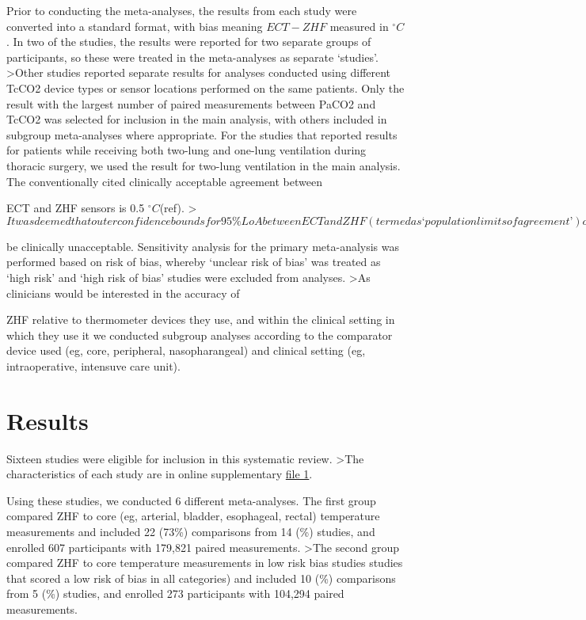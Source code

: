 \documentclass[smallextended]{svjour3}       %
\begin{document}
Prior to conducting the meta-analyses, the results from each study were
converted into a standard format, with bias meaning \(ECT - ZHF\)
measured in \(^\circ C\). In two of the studies, the results were
reported for two separate groups of participants, so these were treated
in the meta-analyses as separate `studies'. \textgreater{}Other studies
reported separate results for analyses conducted using different TcCO2
device types or sensor locations performed on the same patients. Only
the result with the largest number of paired measurements between PaCO2
and TcCO2 was selected for inclusion in the main analysis, with others
included in subgroup meta-analyses where appropriate. For the studies
that reported results for patients while receiving both two-lung and
one-lung ventilation during thoracic surgery, we used the result for
two-lung ventilation in the main analysis. The conventionally cited
clinically acceptable agreement between

ECT and ZHF sensors is 0.5 \(^\circ C\)(ref).
\textgreater{}\(It was deemed that outer confidence bounds for 95\% LoA between ECT and ZHF (termed as ‘population limits of agreement’) outside of these bounds would\)

be clinically unacceptable. Sensitivity analysis for the primary
meta-analysis was performed based on risk of bias, whereby `unclear risk
of bias' was treated as `high risk' and `high risk of bias' studies were
excluded from analyses. \textgreater{}As clinicians would be interested
in the accuracy of

ZHF relative to thermometer devices they use, and within the clinical
setting in which they use it we conducted subgroup analyses according to
the comparator device used (eg, core, peripheral, nasopharangeal) and
clinical setting (eg, intraoperative, intensuve care unit).

\hypertarget{results}{%
\section{Results}\label{results}}

Sixteen studies were eligible for inclusion in this systematic review.
\textgreater{}The characteristics of each study are in online
supplementary \href{link\%20to\%20file\%201}{file 1}.

Using these studies, we conducted 6 different meta-analyses. The first
group compared ZHF to core (eg, arterial, bladder, esophageal, rectal)
temperature measurements and included 22 (73\%) comparisons from 14 (\%)
studies, and enrolled 607 participants with 179,821 paired measurements.
\textgreater{}The second group compared ZHF to core temperature
measurements in low risk bias studies studies that scored a low risk of
bias in all categories) and included 10 (\%) comparisons from 5 (\%)
studies, and enrolled 273 participants with 104,294 paired measurements.
\end{document}
